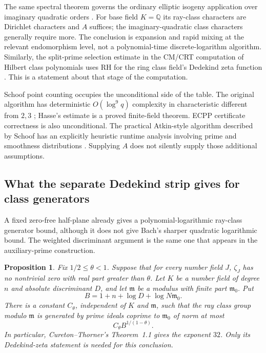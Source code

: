 \documentclass[11pt]{article}
\newcommand{\Q}{\mathbb Q}
\newtheorem{proposition}[theorem]{Proposition}
\theoremstyle{definition}
\theoremstyle{remark}
\begin{document}
The same spectral theorem governs the ordinary elliptic isogeny
application over imaginary quadratic orders
\citep[Theorems~1.1, 1.5--1.6]{JMV2009}. For base field $K=\Q$ its
ray-class characters are Dirichlet characters and $A$ suffices; the
imaginary-quadratic class characters generally require more.
The conclusion is expansion and rapid mixing at the relevant
endomorphism level, not a polynomial-time discrete-logarithm algorithm.
Similarly, the split-prime selection estimate in the CM/CRT computation
of Hilbert class polynomials uses RH for the ring class field's
Dedekind zeta function
\citep[equation (21) and Lemma~2, corrected author pp.~21--22]{Sutherland2011}.
This is a statement about that stage of the computation.

Schoof point counting occupies the unconditional side of the table.
The original algorithm has deterministic $O(\log^9q)$ complexity in
characteristic different from $2,3$
\citep[pp.~483, 485--490]{Schoof1985}; Hasse's estimate is a proved
finite-field theorem. ECPP certificate correctness is also unconditional.
The practical Atkin-style algorithm described by Schoof has an explicitly
heuristic runtime analysis involving prime and smoothness distributions
\citep[Theorem~5.2, p.~121; pp.~122, 124--125]{Schoof2008}.
Supplying $A$ does not silently supply those additional assumptions.

\subsection{What the separate Dedekind strip gives for class generators}
A fixed zero-free half-plane already gives a polynomial-logarithmic
ray-class generator bound, although it does not give Bach's sharper
quadratic logarithmic bound.  The weighted discriminant argument is
the same one that appears in the auxiliary-prime construction.

\begin{proposition}\label{prop:ray-class-strip}
Fix $1/2\le\theta<1$.  Suppose that for every number field $J$,
$\zeta_J$ has no nontrivial zero with real part greater than $\theta$.
Let $K$ be a number field of degree $n$ and absolute discriminant $D$,
and let $\mathfrak m$ be a modulus with finite part
$\mathfrak m_0$.  Put
\[
 B=1+n+\log D+\log N\mathfrak m_0.
\]
There is a constant $C_\theta$, independent of $K$ and
$\mathfrak m$, such that the ray class group modulo $\mathfrak m$
is generated by prime ideals coprime to $\mathfrak m_0$ of norm at most
\[
 C_\theta B^{1/(1-\theta)}.
\]
In particular, Cureton--Thorner's Theorem~1.1 gives the exponent $32$.
Only its Dedekind-zeta statement is needed for this conclusion.
\end{proposition}
\end{document}
